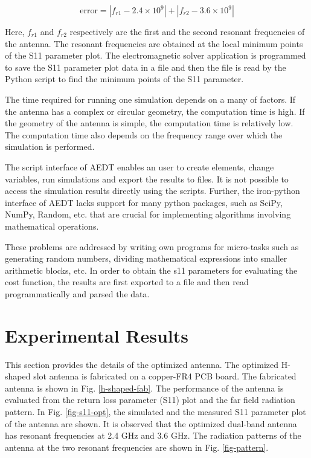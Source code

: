 \begin{equation}\label{dual_cost}
\text{error}=\left|f_{r1}-2.4\times10^9\right|+\left|f_{r2}-3.6\times10^9\right|
\end{equation}

Here, $f_{r1}$ and $f_{r2}$ respectively are the first and the second resonant frequencies of the antenna. The resonant frequencies are obtained at the local minimum points of the S11 parameter plot. The electromagnetic solver application is programmed to save the S11 parameter plot data in a file and then the file is read by the Python script to find the minimum points of the S11 parameter.

The time required for running one simulation depends on a many of factors. If the antenna has a complex or circular geometry, the computation time is high. If the geometry of the antenna is simple, the computation time is relatively low. The computation time also depends on the frequency range over which the simulation is performed.

The script interface of AEDT enables an user to create elements, change variables, run simulations and export the results to files. It is not possible to access the simulation results directly using the scripts. Further, the iron-python interface of AEDT lacks support for many python packages, such as SciPy, NumPy, Random, etc. that are crucial for implementing algorithms involving mathematical operations.

These problems are addressed by writing own programs for micro-tasks such as generating random numbers, dividing mathematical expressions into smaller arithmetic blocks, etc. In order to obtain the s11 parameters for evaluating the cost function, the results are first exported to a file and then read programmatically and parsed the data.

\section{Experimental Results} \label{c3sec_expt-res}
This section provides the details of the optimized antenna. The optimized H-shaped slot antenna is fabricated on a copper-FR4 PCB board. The fabricated antenna is shown in Fig. \ref{h-shaped-fab}. The performance of the antenna is evaluated from the return loss parameter (S11) plot and the far field radiation pattern. In Fig. \ref{fig-s11-opt}, the simulated and the measured S11 parameter plot of the antenna are shown. It is observed that the optimized dual-band antenna has resonant frequencies at 2.4 GHz and 3.6 GHz. The radiation patterns of the antenna at the two resonant frequencies are shown in Fig. \ref{fig-pattern}.

